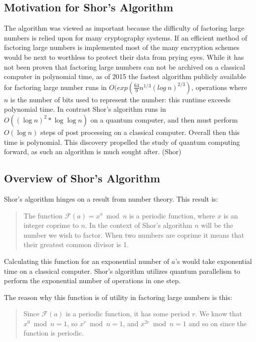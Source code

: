\documentclass[]{article}
\begin{document}
\subsection{Motivation for Shor's Algorithm}

The algorithm was viewed as important because the difficulty of
factoring large numbers is relied upon for many cryptography systems.
If an efficient method of factoring large numbers is implemented most
of the many encryption schemes would be next to worthless to protect
their data from prying eyes.  While it has not been proven that
factoring large numbers can not be archived on a classical computer in
polynomial time, as of 2015 the fastest algorithm publicly available
for factoring large number runs in
$O(exp(\frac{64}{9}n^{1/3} (log\ n)^{2/3})$, operations
where $n$ is the number of bits used to represent the number: this
runtime exceeds polynomial time.  In contrast Shor's algorithm runs in
$O((\log n)^{2} * \log \log n)$ on a quantum computer, and then must
perform $O(\log n)$ steps of post processing on a classical computer.
Overall then this time is polynomial.  This discovery propelled the
study of quantum computing forward, as such an algorithm is much
sought after.  (Shor)

\subsection{Overview of Shor's Algorithm}

Shor's algorithm hinges on a result from number theory.  This result
is: 
    \begin{quote}
      The function $\mathcal{F}(a) = x^{a} \bmod n$ is a periodic
      function, where $x$ is an integer coprime to $n$. In the context
      of Shor's algorithm $n$ will be the number we wish to
      factor. When two numbers are coprime it means that their
      greatest common divisor is 1.
    \end{quote}

Calculating this function for an exponential number of $a$'s would
take exponential time on a classical computer.  Shor's algorithm
utilizes quantum parallelism to perform the exponential number of
operations in one step.

The reason why this function is of utility in factoring large numbers
is this:

\begin{quote}
  Since $\mathcal{F}(a)$ is a periodic function, it has some period
$r$. We know that $x^{0} \bmod n = 1$, so $x^{r} \bmod n = 1$, and
$x^{2r} \bmod n = 1$ and so on since the function is periodic.
\end{quote}
\end{document}
